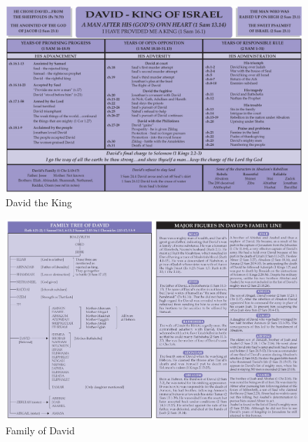 \newpage
\begin{figure}
\begin{center}
\includegraphics[scale=0.6, angle=90]{09OT-1Samuel/References/David-the-King}
\caption[David the King]{David the King}
\label{fig:David the King}
\end{center}
\end{figure}

\newpage
\begin{figure}
\begin{center}
\includegraphics[scale=0.6, angle=90]{09OT-1Samuel/References/Family-of-David}
\caption[Family of David]{Family of David}
\label{fig:Family of David}
\end{center}
\end{figure}

